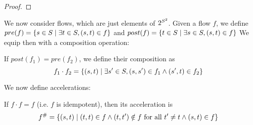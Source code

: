 \documentclass{article}
\begin{document}
\begin{proof}
%	
%	
%	
%	
%	
%	
%	
%	
%	
\end{proof}

We now consider flows, which are just elements of $2^{S^2}$.
Given a flow $f$, we define $pre(f) = \{ s \in S \mid \exists t \in S, (s,t) \in f \}$ and $post(f) = \{ t \in S \mid \exists s \in S, (s,t) \in f \}$
We equip then with a composition operation:

If $post(f_1) = pre(f_2)$, we define their composition as \[f_1 \cdot f_2 = \{ (s, t) \mid \exists s' \in S, (s, s') \in f_1 \land (s', t) \in f_2 \}\]

We now define accelerations: 

If $f\cdot f = f$ (i.e. $f$ is idempotent), then its acceleration is \[f^\# = \{ (s,t) \mid (t, t) \in f \land (t,t') \notin f \text{ for all } t' \neq t \land (s, t) \in f  \}\]
\end{document}
